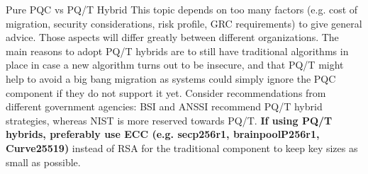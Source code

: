 \begin{minipage}[t]{0.7\textwidth}
\begin{algorithmbox}{Pure PQC vs PQ/T Hybrid}
        This topic depends on too many factors (e.g. cost of migration, security considerations, risk profile, GRC requirements) to give general advice. Those aspects will differ greatly between different organizations. The main reasons to adopt PQ/T hybrids are to still have traditional algorithms in place in case a new algorithm turns out to be insecure, and that PQ/T might help to avoid a big bang migration as systems could simply ignore the PQC component if they do not support it yet. Consider recommendations from different government agencies: BSI and ANSSI recommend PQ/T hybrid strategies, whereas NIST is more reserved towards PQ/T. {\bfseries If using PQ/T hybrids, preferably use  ECC (e.g. secp256r1, brainpoolP256r1, Curve25519)} instead of RSA for the traditional component to keep key sizes as small as possible.\\
        \vspace{0.4mm}
    \end{algorithmbox}
\end{minipage}
